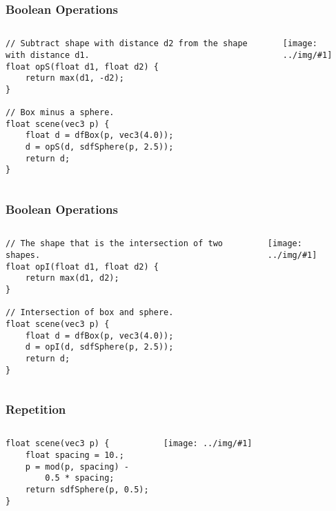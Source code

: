 \documentclass{beamer}
\newcommand\graphic[1]{\texttt{[image: ../img/\#1]}}
\begin{document}
\begin{frame}[fragile]
    \frametitle{Boolean Operations}
    \begin{columns}
        \begin{verbatim}
// Subtract shape with distance d2 from the shape with distance d1.
float opS(float d1, float d2) {
    return max(d1, -d2);
}

// Box minus a sphere.
float scene(vec3 p) {
    float d = dfBox(p, vec3(4.0));
    d = opS(d, sdfSphere(p, 2.5));
    return d;
}
        \end{verbatim}
        \graphic{box-minus-sphere.png}
    \end{columns}
\end{frame}

\begin{frame}[fragile]
    \frametitle{Boolean Operations}
    \begin{columns}
        \begin{verbatim}
// The shape that is the intersection of two shapes.
float opI(float d1, float d2) {
    return max(d1, d2);
}

// Intersection of box and sphere.
float scene(vec3 p) {
    float d = dfBox(p, vec3(4.0));
    d = opI(d, sdfSphere(p, 2.5));
    return d;
}
        \end{verbatim}
        \graphic{box-intersect-sphere.png}
    \end{columns}
\end{frame}

\begin{frame}[fragile]
    \frametitle{Repetition}
    \begin{columns}
        \begin{verbatim}
float scene(vec3 p) {
    float spacing = 10.;
    p = mod(p, spacing) -
        0.5 * spacing;
    return sdfSphere(p, 0.5);
}
        \end{verbatim}
        \graphic{infinite-spheres.png}
    \end{columns}
\end{frame}
\end{document}
